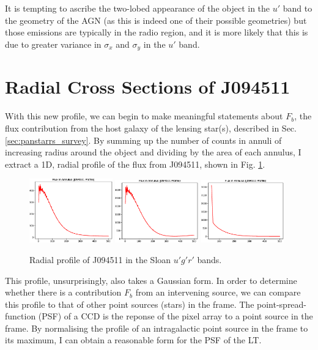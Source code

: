 \documentclass[a4paper,11pt]{article}
\begin{document}
It is tempting to ascribe the two-lobed appearance of the object in the $u'$ band to the geometry of the AGN (as this is indeed one of their possible geometries) but those emissions are typically in the radio region, and it is more likely that this is due to greater variance in $\sigma_x$ and $\sigma_y$ in the $u'$ band.

\section{Radial Cross Sections of J094511}

With this new profile, we can begin to make meaningful statements about $F_b$, the flux contribution from the host galaxy of the lensing star(s), described in Sec. \ref{sec:panstarrs_survey}. By summing up the number of counts in annuli of increasing radius around the object and dividing by the area of each annulus, I extract a 1D, radial profile of the flux from J094511, shown in Fig. \ref{fig:radial_profiles}.

\begin{figure}[h!]
    \includegraphics[width=0.32\textwidth]{J094511_U_annulus_flux.eps}
    \includegraphics[width=0.32\textwidth]{J094511_G_annulus_flux.eps}
    \includegraphics[width=0.32\textwidth]{J094511_R_annulus_flux.eps}
    \caption{Radial profile of J094511 in the Sloan $u'g'r'$ bands.}
    \label{fig:radial_profiles}
\end{figure}

This profile, unsurprisingly, also takes a Gaussian form. In order to determine whether there is a contribution $F_b$ from an intervening source, we can compare this profile to that of other point sources (stars) in the frame. The point-spread-function (PSF) of a CCD is the reponse of the pixel array to a point source in the frame.\cite{photutils_psf}\cite{anderson_2000} By normalising the profile of an intragalactic point source in the frame to its maximum, I can obtain a reasonable form for the PSF of the LT.
\end{document}
